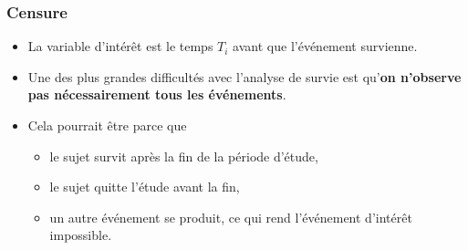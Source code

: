 \documentclass{beamer}
\begin{document}

\begin{frame}
\frametitle{Censure}
\begin{itemize}
 \item La variable d'intérêt est le temps $T_i$ avant que l'événement survienne.
\item Une des plus grandes difficultés avec l'analyse de survie est qu'\textbf{on n'observe pas nécessairement tous les événements}.
\item Cela pourrait être parce que
\begin{itemize}
\vp \vp
\item le sujet survit après la fin de la période d'étude,
\item le sujet quitte l'étude avant la fin,
\item un autre événement se produit, ce qui rend l'événement d'intérêt impossible.
\end{itemize}
\end{itemize}
\end{frame}
% 
% 
\end{document}
